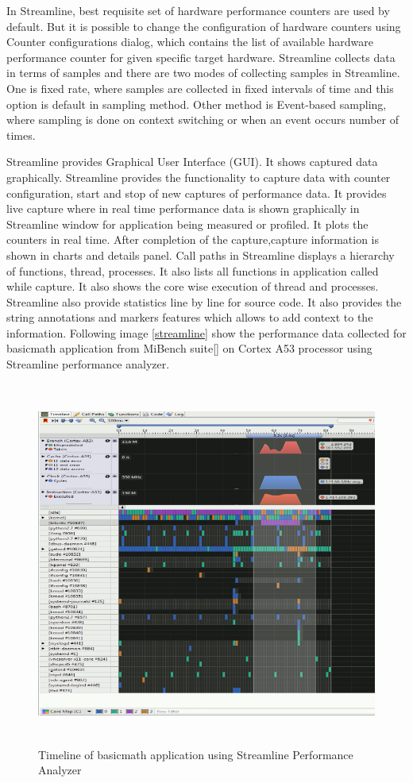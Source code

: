 \par In Streamline, best requisite set of hardware performance counters are used by default. But it is possible to change the configuration of hardware counters using Counter configurations dialog, which contains the list of available hardware performance counter for given specific target hardware. Streamline collects data in terms of samples and there are two modes of collecting samples in Streamline. One is fixed rate, where samples are collected in fixed intervals of time and this option is default in sampling method. Other method is Event-based sampling, where sampling is done on context switching or when an event occurs number of times.

\par Streamline provides Graphical User Interface (GUI). It shows captured data graphically. Streamline provides the functionality to capture data with counter configuration, start and stop of new captures of performance data. It provides live capture where in real time performance data is shown graphically in Streamline window for application being measured or profiled. It plots the counters in real time. After completion of the capture,capture information is shown in charts and details panel. Call paths in Streamline displays a hierarchy of functions, thread, processes. It also lists all functions in application called while capture. It also shows the core wise execution of thread and processes. Streamline also provide statistics line by line for source code. It also provides the string annotations and markers features which allows to add context to the information. Following image \ref{streamline} show the performance data collected for basicmath application from MiBench suite[] on Cortex A53 processor using Streamline performance analyzer. 

\begin{figure}[h!]
\includegraphics[width=16cm, height=12cm]{./images/streamline}
\centering
\caption{Timeline of basicmath application using Streamline Performance Analyzer}
\label{fig:streamline}
\end{figure} 

